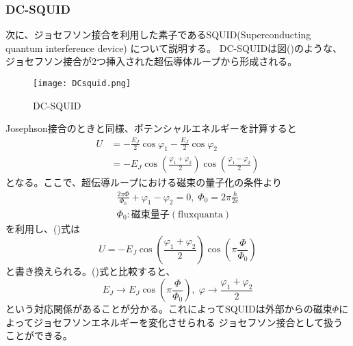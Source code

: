         \subsubsection{DC-SQUID}
        次に、ジョセフソン接合を利用した素子であるSQUID(Superconducting quantum interference device) について説明する。
        DC-SQUIDは図()のような、ジョセフソン接合が2つ挿入された超伝導体ループから形成される。
        \begin{figure}
            \begin{center}
                \texttt{[image: DCsquid.png]}
                \caption{DC-SQUID}
            \end{center}
        \end{figure}
        Josephson接合のときと同様、ポテンシャルエネルギーを計算すると
        \begin{equation}
        \begin{split}
             U&=-\frac{E_J}{2} \cos \varphi_1-\frac{E_J}{2} \cos \varphi_2\\
            &=-E_J \cos (\frac{\varphi_1+\varphi_2}{2})\cos (\frac{\varphi_1-\varphi_2}{2})
        \end{split} 
        \end{equation}
        となる。ここで、超伝導ループにおける磁束の量子化の条件より
        \begin{equation}
        \begin{split}
            \frac{2\pi \Phi}{\Phi_0}+\varphi_1-\varphi_2=0 , \;  \Phi_0 = 2\pi\frac{\hbar}{2e}\\
            \Phi_0 : \mathrm{磁束量子(flux quanta)}
        \end{split}    
        \end{equation}
        を利用し、()式は
        \begin{equation}
            U=-E_J \cos (\frac{\varphi_1+\varphi_2}{2})\cos (\pi\frac{\Phi}{\Phi_0})
        \end{equation}
        と書き換えられる。()式と比較すると、
        \begin{equation}
            E_J \to E_J \cos (\pi\frac{\Phi}{\Phi_0}) , \;\varphi \to \frac{\varphi_1+\varphi_2}{2}
        \end{equation}
        という対応関係があることが分かる。これによってSQUIDは外部からの磁束$\Phi$によってジョセフソンエネルギーを変化させられる
        ジョセフソン接合として扱うことができる。
